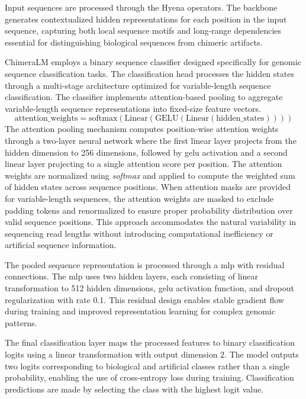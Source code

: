 \documentclass[pdflatex,sn-nature]{sn-jnl}%
\theoremstyle{thmstyleone}%
\theoremstyle{thmstyletwo}%
\theoremstyle{thmstylethree}%
\begin{document}
Input sequences are processed through the Hyena operators.
The backbone generates contextualized hidden representations for each position in the input sequence, capturing both local sequence motifs and long-range dependencies essential for distinguishing biological sequences from chimeric artifacts.

ChimeraLM employs a binary sequence classifier designed specifically for genomic sequence classification tasks.
The classification head processes the hidden states through a multi-stage architecture optimized for variable-length sequence classification.
The classifier implements attention-based pooling to aggregate variable-length sequence representations into fixed-size feature vectors.
$$
	\textrm{attention\_weights} = \textrm{softmax}(\textrm{Linear}(\textrm{GELU}(\textrm{Linear}(\textrm{hidden\_states}))))
$$
The attention pooling mechanism computes position-wise attention weights through a two-layer neural network where the first linear layer projects from the hidden dimension to 256 dimensions, followed by \gls{gelu} activation and a second linear layer projecting to a single attention score per position.
The attention weights are normalized using \emph{softmax} and applied to compute the weighted sum of hidden states across sequence positions.
When attention masks are provided for variable-length sequences, the attention weights are masked to exclude padding tokens and renormalized to ensure proper probability distribution over valid sequence positions.
This approach accommodates the natural variability in sequencing read lengths without introducing computational inefficiency or artificial sequence information.

The pooled sequence representation is processed through a \gls{mlp} with residual connections.
The \gls{mlp} uses two hidden layers, each consisting of linear transformation to 512 hidden dimensions, \gls{gelu} activation function, and dropout regularization with rate 0.1.
This residual design enables stable gradient flow during training and improved representation learning for complex genomic patterns.

The final classification layer maps the processed features to binary classification logits using a linear transformation with output dimension 2.
The model outputs two logits corresponding to biological and artificial classes rather than a single probability, enabling the use of cross-entropy loss during training.
Classification predictions are made by selecting the class with the highest logit value.
\end{document}
